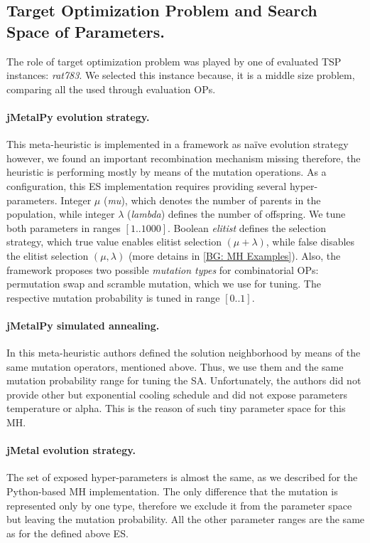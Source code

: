 \subsection{Target Optimization Problem and Search Space of Parameters.} 
The role of target optimization problem was played by one of evaluated TSP instances: \emph{rat783}. We selected this instance because, it is a middle size problem, comparing all the used through evaluation OPs.

\paragraph{jMetalPy evolution strategy.} This meta-heuristic is implemented in a framework as na\"ive evolution strategy however, we found an important recombination mechanism missing therefore, the heuristic is performing mostly by means of the mutation operations. As a configuration, this ES implementation requires providing several hyper-parameters. Integer $\mu$ (\emph{mu}), which denotes the number of parents in the population, while integer $\lambda$ (\emph{lambda}) defines the number of offspring. We tune both parameters in ranges $[1..1000]$. Boolean \emph{elitist} defines the selection strategy, which true value enables elitist selection $(\mu+\lambda)$, while false disables the elitist selection $(\mu,\lambda)$ (more detains in \cref{BG: MH Examples}). Also, the framework proposes two possible \emph{mutation types} for combinatorial OPs: permutation swap and scramble mutation, which we use for tuning. The respective mutation probability is tuned in range $[0..1]$.

\paragraph{jMetalPy simulated annealing.} In this meta-heuristic authors defined the solution neighborhood by means of the same mutation operators, mentioned above. Thus, we use them and the same mutation probability range for tuning the SA. Unfortunately, the authors did not provide other but exponential cooling schedule and did not expose parameters temperature or alpha. This is the reason of such tiny parameter space for this MH.

\paragraph{jMetal evolution strategy.} The set of exposed hyper-parameters is almost the same, as we described for the Python-based MH implementation. The only difference that the mutation is represented only by one type, therefore we exclude it from the parameter space but leaving the mutation probability. All the other parameter ranges are the same as for the defined above ES.


